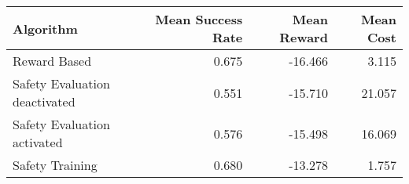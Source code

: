 \begin{tabular}{lrrr}
\toprule
Algorithm & Mean Success Rate & Mean Reward & Mean Cost \\
\midrule
Reward Based      &             0.675 &     -16.466 &     3.115 \\
Safety Evaluation deactivated      &             0.551 &     -15.710 &    21.057 \\
Safety Evaluation activated &             0.576 &     -15.498 &    16.069 \\
Safety Training   &             0.680 &     -13.278 &     1.757 \\
\bottomrule
\end{tabular}